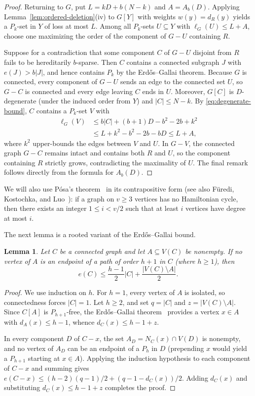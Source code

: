 \documentclass[10pt]{article}
\theoremstyle{compactplain}
\newtheorem{lemma}[theorem]{Lemma}
\theoremstyle{remark}\newtheorem{remark}[theorem]{Remark}
\begin{document}
\begin{proof}
Returning to $G$, put $L=kD+b(N-k)$ and $A=A_b(D)$. Applying
Lemma~\ref{lem:ordered-deletion}(iv) to $G[Y]$ with weights $w(y)=d_R(y)$
yields a $P_k$-set in $Y$ of loss at most $L$. Among all $P_k$-sets
$U\subseteq Y$ with $\ell_G(U)\le L+A$, choose one maximizing the order
of the component of $G-U$ containing $R$.

Suppose for a contradiction that some component $C$ of $G-U$ disjoint
from $R$ fails to be hereditarily $b$-sparse. Then $C$ contains a
connected subgraph $J$ with $e(J)>b|J|$, and hence contains $P_k$ by the
Erd\H{o}s--Gallai theorem. Because $G$ is connected, every component of
$G-U$ sends an edge to the connected set $U$, so $G-C$ is connected and
every edge leaving $C$ ends in $U$. Moreover, $G[C]$ is $D$-degenerate
(under the induced order from $Y$) and $|C|\le N-k$. By
\eqref{eq:degenerate-bound}, $C$ contains a $P_k$-set $V$ with
\begin{align*}
 \ell_G(V) &\le b|C|+(b+1)D-b^2-2b+k^2\\
 &\le L+k^2-b^2-2b-bD\le L+A,
\end{align*}
where $k^2$ upper-bounds the edges between $V$ and $U$. In $G-V$, the
connected graph $G-C$ remains intact and contains both $R$ and $U$, so
the component containing $R$ strictly grows, contradicting the
maximality of $U$. The final remark follows directly from the formula
for $A_b(D)$.
\end{proof}

We will also use P\'osa's theorem~\cite{Posa} in its contrapositive
form (see also F\"uredi, Kostochka, and Luo~\cite[Theorem~4]{FKL}): if a
graph on $v\ge3$ vertices has no Hamiltonian cycle, then there exists an
integer $1\le i<v/2$ such that at least $i$ vertices have degree at most
$i$.

The next lemma is a rooted variant of the Erd\H{o}s--Gallai bound.

\begin{lemma}\label{lem:marked-root}
Let $C$ be a connected graph and let $A\subseteq V(C)$ be nonempty. If
no vertex of $A$ is an endpoint of a path of order $h+1$ in $C$ (where
$h\ge1$), then
\[
 e(C)\le\frac{h-1}{2}|C|+\frac{|V(C)\setminus A|}{2}.
\]
\end{lemma}
\begin{proof}
We use induction on $h$. For $h=1$, every vertex of $A$ is isolated, so
connectedness forces $|C|=1$. Let $h\ge2$, and set $q=|C|$ and
$z=|V(C)\setminus A|$. Since $C[A]$ is $P_{h+1}$-free, the
Erd\H{o}s--Gallai theorem~\cite{EG} provides a vertex $x\in A$ with
$d_A(x)\le h-1$, whence $d_C(x)\le h-1+z$.

In every component $D$ of $C-x$, the set $A_D=N_C(x)\cap V(D)$ is
nonempty, and no vertex of $A_D$ can be an endpoint of a $P_h$ in $D$
(prepending $x$ would yield a $P_{h+1}$ starting at $x\in A$). Applying
the induction hypothesis to each component of $C-x$ and summing gives
$e(C-x)\le(h-2)(q-1)/2+(q-1-d_C(x))/2$. Adding $d_C(x)$ and substituting
$d_C(x)\le h-1+z$ completes the proof.
\end{proof}
\end{document}
